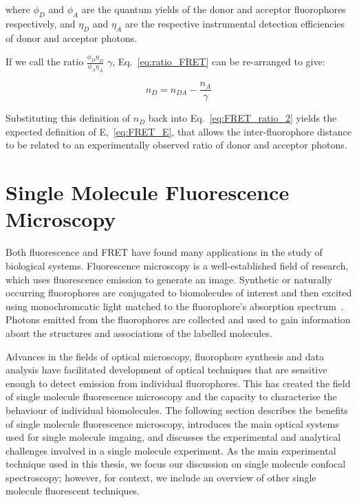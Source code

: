 where $\phi_D$ and $\phi_A$ are the quantum yields of the donor and acceptor fluorophores respectively, and $\eta_D$ and $\eta_A$ are the respective instrumental detection efficiencies of donor and acceptor photons.

If we call the ratio $\frac{\phi_D\eta_D}{\phi_A\eta_A}$ $\gamma$, Eq.~\ref{eq:ratio_FRET} can be re-arranged to give:

\begin{equation}
n_D = n_{DA} - \frac{n_A}{\gamma}
\label{eq:get_gamma}
\end{equation}

Substituting this definition of $n_D$ back into Eq.~\ref{eq:FRET_ratio_2} yields the expected definition of E,~\ref{eq:FRET_E}, that allows the inter-fluorophore distance to be related to an experimentally observed ratio of donor and acceptor photons.

\section{Single Molecule Fluorescence Microscopy}
Both fluorescence and FRET have found many applications in the study of biological systems. Fluorescence microscopy is a well-established field of research, which uses fluorescence emission to generate an image. Synthetic or naturally occurring fluorophores are conjugated to biomolecules of interest and then excited using monochromcatic light matched to the fluorophore's absorption spectrum~\cite{Michalet2003}. Photons emitted from the fluorophores are collected and used to gain information about the structures and associations of the labelled molecules. 

Advances in the fields of optical microscopy, fluorophore synthesis and data analysis have facilitated development of optical techniques that are sensitive enough to detect emission from individual fluorophores. This has created the field of single molecule fluorescence microscopy and the capacity to characterise the behaviour of individual biomolecules. The following section describes the benefits of single molecule fluorescence microscopy, introduces the main optical systems used for single molecule imgaing, and discusses the experimental and analytical challenges involved in a single molecule experiment. As the main experimental technique used in this thesis, we focus our discussion on single molecule confocal spectroscopy; however, for context, we include an overview of other single molecule fluorescent techniques.  

